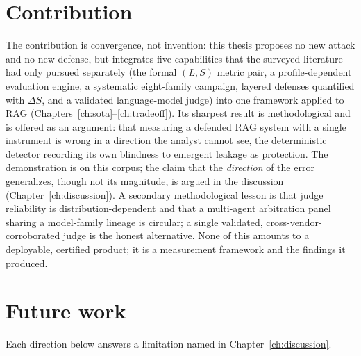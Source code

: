 \documentclass[11pt,a4paper]{report}
\begin{document}
\section{Contribution}
\label{sec:concl-contribution}

The contribution is convergence, not invention: this thesis proposes no new attack and no new
defense, but integrates five capabilities that the surveyed literature had only pursued
separately (the formal $(L,S)$ metric pair, a profile-dependent evaluation engine, a
systematic eight-family campaign, layered defenses quantified with $\Delta S$, and a validated
language-model judge) into one framework applied to RAG (Chapters~\ref{ch:sota}--\ref{ch:tradeoff}).
Its sharpest result is methodological and is offered as an argument: that measuring a defended
RAG system with a single instrument is wrong in a direction the analyst cannot see, the
deterministic detector recording its own blindness to emergent leakage as protection. The
demonstration is on this corpus; the claim that the \emph{direction} of the error generalizes,
though not its magnitude, is argued in the discussion (Chapter~\ref{ch:discussion}). A
secondary methodological lesson is that judge reliability is distribution-dependent and that a
multi-agent arbitration panel sharing a model-family lineage is circular; a single validated,
cross-vendor-corroborated judge is the honest alternative. None of this amounts to a deployable,
certified product; it is a measurement framework and the findings it produced.

\section{Future work}
\label{sec:concl-future}

Each direction below answers a limitation named in Chapter~\ref{ch:discussion}.
\end{document}
